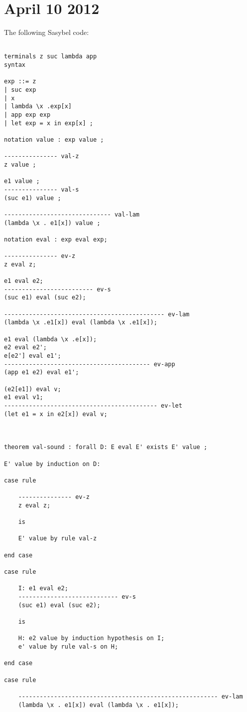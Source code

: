 \documentclass[12pt]{article}
\begin{document}
\section{April 10 2012}
The following \textmd{Sasybel} code:
\footnotesize\begin{verbatim}

terminals z suc lambda app
syntax 

exp ::= z
| suc exp
| x
| lambda \x .exp[x] 
| app exp exp 
| let exp = x in exp[x] ;

notation value : exp value ;

--------------- val-z
z value ;

e1 value ;
--------------- val-s
(suc e1) value ;

------------------------------ val-lam
(lambda \x . e1[x]) value ;

notation eval : exp eval exp;

--------------- ev-z
z eval z;

e1 eval e2;
------------------------- ev-s
(suc e1) eval (suc e2);

--------------------------------------------- ev-lam
(lambda \x .e1[x]) eval (lambda \x .e1[x]);

e1 eval (lambda \x .e[x]);
e2 eval e2';
e[e2'] eval e1';
----------------------------------------- ev-app
(app e1 e2) eval e1';

(e2[e1]) eval v;
e1 eval v1;
------------------------------------------- ev-let
(let e1 = x in e2[x]) eval v;



theorem val-sound : forall D: E eval E' exists E' value ;

E' value by induction on D:

case rule

	--------------- ev-z
	z eval z;

	is

	E' value by rule val-z

end case

case rule 

	I: e1 eval e2;
	---------------------------- ev-s
	(suc e1) eval (suc e2);

	is

	H: e2 value by induction hypothesis on I;
	e' value by rule val-s on H;

end case

case rule 

	-------------------------------------------------------- ev-lam
	(lambda \x . e1[x]) eval (lambda \x . e1[x]);


\end{verbatim}
\end{document}
